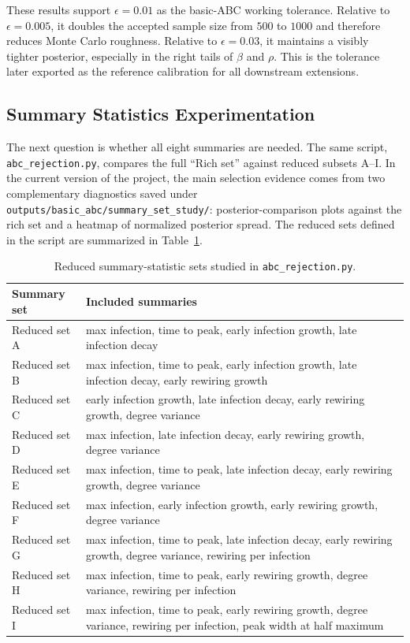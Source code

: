 \documentclass[11pt]{article}
\begin{document}
These results support $\epsilon=0.01$ as the basic-ABC working tolerance. Relative to $\epsilon=0.005$, it doubles the accepted sample size from $500$ to $1000$ and therefore reduces Monte Carlo roughness. Relative to $\epsilon=0.03$, it maintains a visibly tighter posterior, especially in the right tails of $\beta$ and $\rho$. This is the tolerance later exported as the reference calibration for all downstream extensions.

\subsection{Summary Statistics Experimentation}

The next question is whether all eight summaries are needed. The same script, \texttt{abc\_rejection.py}, compares the full ``Rich set'' against reduced subsets A--I. In the current version of the project, the main selection evidence comes from two complementary diagnostics saved under \texttt{outputs/basic\_abc/summary\_set\_study/}: posterior-comparison plots against the rich set and a heatmap of normalized posterior spread. The reduced sets defined in the script are summarized in Table~\ref{tab:reduced-sets}.

\begin{table}[H]
\centering
\caption{Reduced summary-statistic sets studied in \texttt{abc\_rejection.py}.}
\label{tab:reduced-sets}
\begin{tabular}{>{\raggedright\arraybackslash}p{} >{\raggedright\arraybackslash}p{}}
\toprule
Summary set & Included summaries \\
\midrule
Reduced set A & max infection, time to peak, early infection growth, late infection decay \\
Reduced set B & max infection, time to peak, early infection growth, late infection decay, early rewiring growth \\
Reduced set C & early infection growth, late infection decay, early rewiring growth, degree variance \\
Reduced set D & max infection, late infection decay, early rewiring growth, degree variance \\
Reduced set E & max infection, time to peak, late infection decay, early rewiring growth, degree variance \\
Reduced set F & max infection, early infection growth, early rewiring growth, degree variance \\
Reduced set G & max infection, time to peak, late infection decay, early rewiring growth, degree variance, rewiring per infection \\
Reduced set H & max infection, time to peak, early rewiring growth, degree variance, rewiring per infection \\
Reduced set I & max infection, time to peak, early rewiring growth, degree variance, rewiring per infection, peak width at half maximum \\
\bottomrule
\end{tabular}
\end{table}
\end{document}
